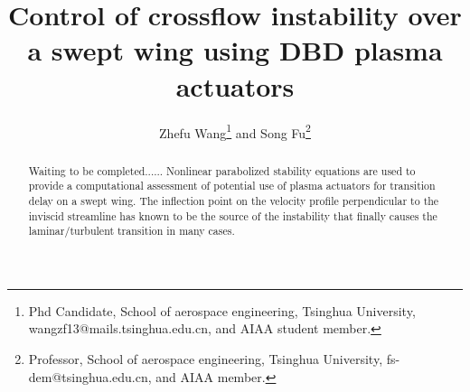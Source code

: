 \documentclass{AIAA}
\begin{document}
\title{Control of crossflow instability over a swept wing using DBD plasma actuators}

\author{Zhefu Wang\footnote{Phd Candidate, School of aerospace engineering, Tsinghua University, wangzf13@mails.tsinghua.edu.cn, and AIAA student member.} and Song Fu\footnote{Professor, School of aerospace engineering, Tsinghua University, fs-dem@tsinghua.edu.cn, and AIAA member.}}

\begin{abstract}
{\color{red} Waiting to be completed......
Nonlinear parabolized stability equations are used to provide a computational assessment of potential use of plasma actuators for transition delay on a swept wing. The inflection point on the velocity profile perpendicular to the inviscid streamline has known to be the source of the instability that finally causes the laminar/turbulent transition in many cases.}
\end{abstract}

\maketitle
\end{document}
